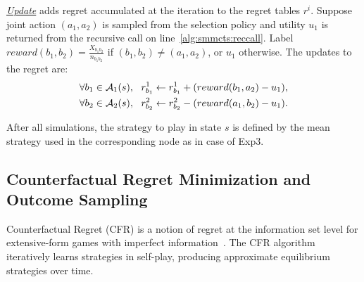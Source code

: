 \emph{\underline{Update}} adds regret accumulated at the iteration to
the regret tables $r^i$. Suppose joint action $(a_1,a_2)$ is
sampled from the selection policy and utility $u_1$ is returned from the recursive call on line~\ref{alg:smmcts:reccall}.
Label $reward(b_1,b_2) = \frac{X_{b_1b_2}}{n_{b_1b_2}}$ if
$(b_1,b_2) \not= (a_1,a_2)$, or $u_1$ otherwise. The updates to the regret are:
\begin{eqnarray}
\forall b_1 \in \mathcal{A}_1(s), ~~  r^1_{b_1} \leftarrow r^1_{b_1} + ( reward(b_1, a_2) - u_1 ),\\
\forall b_2 \in \mathcal{A}_2(s), ~~  r^2_{b_2} \leftarrow r^2_{b_2} - ( reward(a_1, b_2) - u_1).
\end{eqnarray}

After all simulations, the strategy to play in state $s$ is defined by the mean strategy used in the corresponding node as in case of Exp3.

\subsection{Counterfactual Regret Minimization and Outcome Sampling} \label{sec:algs:cfros}

Counterfactual Regret (CFR) is a notion of regret at the information set level for extensive-form games with imperfect information~\cite{CFR}.
The CFR algorithm iteratively learns strategies in self-play, producing approximate equilibrium strategies over time. 

